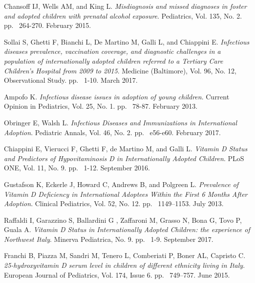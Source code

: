 \begin{thebibliography}{50}
  Chansoff IJ, Wells AM, and King L.
  \textit{Misdiagnosis and missed diagnoses in foster and adopted children with prenatal alcohol exposure}.
  Pediatrics, Vol. 135, No. 2.
  pp. ~264-270.
  February 2015.
  
  Sollai S, Ghetti F, Bianchi L, De Martino M, Galli L, and Chiappini E.
  \textit{Infectious diseases prevalence, vaccination coverage, and diagnostic challenges in a population of internationally adopted children referred to a Tertiary Care Children’s Hospital from 2009 to 2015}.
  Medicine (Baltimore), Vol. 96, No. 12,
  Observational Study.
  pp. ~1-10.
  March 2017.
  
  Ampofo K.
  \textit{Infectious disease issues in adoption of young children}.
  Current Opinion in Pediatrics, Vol. 25, No. 1.
  pp. ~78-87.
  February 2013.
  
  Obringer E, Walsh L.
  \textit{Infectious Diseases and Immunizations in International Adoption}.
  Pediatric Annals, Vol. 46, No. 2.
  pp. ~e56-e60.
  February 2017.
  
  Chiappini E, Vierucci F, Ghetti F, de Martino M, and Galli L.
  \textit{Vitamin D Status and Predictors of Hypovitaminosis D in Internationally Adopted Children}.
  PLoS ONE, Vol. 11, No. 9.
  pp. ~1-12.
  September 2016.
  
  Gustafson K, Eckerle J, Howard C, Andrews B, and Polgreen L.
  \textit{Prevalence of Vitamin D Deficiency in International Adoptees Within the First 6 Months After Adoption}.
  Clinical Pediatrics, Vol. 52, No. 12.
  pp. ~1149–1153.
  July 2013.
  
  Raffaldi I, Garazzino S, Ballardini G , Zaffaroni M, Grasso N, Bona G, Tovo P, Guala A.
  \textit{Vitamin D Status in Internationally Adopted Children: the experience of Northwest Italy}.
  Minerva Pediatrica, No. 9.
  pp. ~1-9.
  September 2017.
  
  Franchi B, Piazza M, Sandri M, Tenero L, Comberiati P, Boner AL, Capristo C.
  \textit{25-hydroxyvitamin D serum level in children of different ethnicity living in Italy}.
  European Journal of Pediatrics, Vol. 174, Issue 6.
  pp. ~749–757.
  June 2015.
  

\end{thebibliography}
